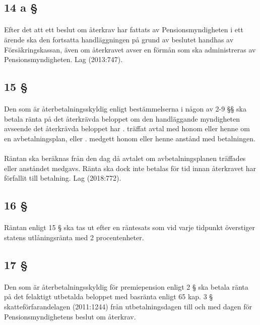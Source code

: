 \documentclass[a4paper,notitlepage,openany,10pt]{book}
\begin{document}
\subsection*{14 a §}
\paragraph*{}
Efter det att ett beslut om återkrav har fattats av Pensionsmyndigheten i ett ärende ska den fortsatta handläggningen på grund av beslutet handhas av Försäkringskassan, även om återkravet avser en förmån som ska administreras av Pensionsmyndigheten.
Lag (2013:747).
\subsection*{15 §}
\paragraph*{}
Den som är återbetalningsskyldig enligt bestämmelserna i någon av 2-9 §§ ska betala ränta på det återkrävda beloppet om den handläggande myndigheten avseende det återkrävda beloppet har
. träffat avtal med honom eller henne om en avbetalningsplan, eller
. medgett honom eller henne anstånd med betalningen.
\paragraph*{}
Räntan ska beräknas från den dag då avtalet om avbetalningsplanen träffades eller anståndet medgavs. Ränta ska dock inte betalas för tid innan återkravet har förfallit till betalning.
Lag (2018:772).
\subsection*{16 §}
\paragraph*{}
Räntan enligt 15 § ska tas ut efter en räntesats som vid varje tidpunkt överstiger statens utlåningsränta med 2 procentenheter.
\subsection*{17 §}
\paragraph*{}
Den som är återbetalningsskyldig för premiepension enligt 2 § ska betala ränta på det felaktigt utbetalda beloppet med basränta enligt 65 kap. 3 § skatteförfarandelagen (2011:1244) från utbetalningsdagen till och med dagen för Pensionsmyndighetens beslut om återkrav.
\end{document}
